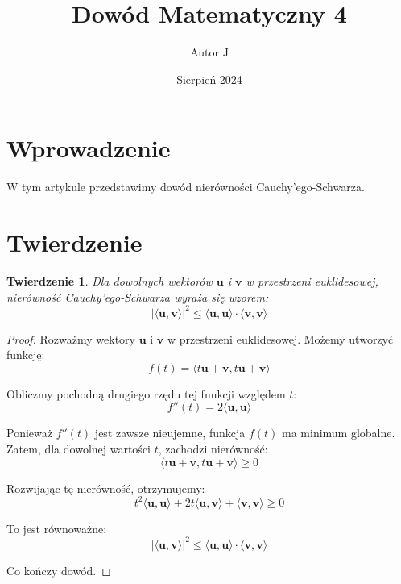 \documentclass{article}
\title{Dowód Matematyczny 4}
\author{Autor J}
\date{Sierpień 2024}
\theoremstyle{plain}
\newtheorem{theorem}{Twierdzenie}
\begin{document}
\maketitle

\section{Wprowadzenie}

W tym artykule przedstawimy dowód nierówności Cauchy'ego-Schwarza.

\section{Twierdzenie}

\begin{theorem}
Dla dowolnych wektorów $\mathbf{u}$ i $\mathbf{v}$ w przestrzeni euklidesowej, nierówność Cauchy'ego-Schwarza wyraża się wzorem:
\[ |\langle \mathbf{u}, \mathbf{v} \rangle|^2 \leq \langle \mathbf{u}, \mathbf{u} \rangle \cdot \langle \mathbf{v}, \mathbf{v} \rangle \]
\end{theorem}

\begin{proof}
Rozważmy wektory $\mathbf{u}$ i $\mathbf{v}$ w przestrzeni euklidesowej. Możemy utworzyć funkcję:
\[ f(t) = \langle t\mathbf{u} + \mathbf{v}, t\mathbf{u} + \mathbf{v} \rangle \]

Obliczmy pochodną drugiego rzędu tej funkcji względem $t$:
\[ f''(t) = 2 \langle \mathbf{u}, \mathbf{u} \rangle \]

Ponieważ $f''(t)$ jest zawsze nieujemne, funkcja $f(t)$ ma minimum globalne. Zatem, dla dowolnej wartości $t$, zachodzi nierówność:
\[ \langle t\mathbf{u} + \mathbf{v}, t\mathbf{u} + \mathbf{v} \rangle \geq 0 \]

Rozwijając tę nierówność, otrzymujemy:
\[ t^2 \langle \mathbf{u}, \mathbf{u} \rangle + 2t \langle \mathbf{u}, \mathbf{v} \rangle + \langle \mathbf{v}, \mathbf{v} \rangle \geq 0 \]

To jest równoważne:
\[ |\langle \mathbf{u}, \mathbf{v} \rangle|^2 \leq \langle \mathbf{u}, \mathbf{u} \rangle \cdot \langle \mathbf{v}, \mathbf{v} \rangle \]

Co kończy dowód.
\end{proof}
\end{document}

